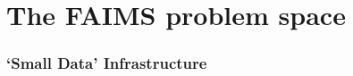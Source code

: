 \documentclass[
	aspectratio=169, %
	12pt, %
	t, %
]{beamer}
\begin{document}
\begin{refsegment}
\begin{frame}
    \begin{columns}[t]
        \begin{column}{0.45\textwidth}
            \tableofcontents[sections={1-3}] %
        \end{column}
        \hfill
        \begin{column}{0.45\textwidth}
            \tableofcontents[sections={4-6}] %
        \end{column}
    \end{columns}
\end{frame}


\section{The FAIMS problem space}

\begin{sectionframe} %
	\frametitle{`Small Data' Infrastructure}


\end{sectionframe}





\end{refsegment}
\end{document}
